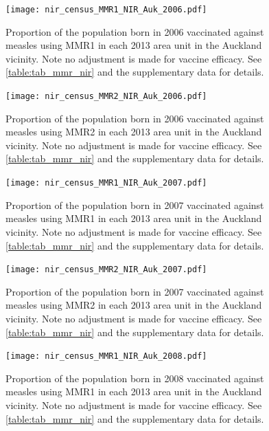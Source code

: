 \documentclass{article}
\begin{document}
% 
\begin{figure}
   \begin{center}
    \texttt{[image: nir\_census\_MMR1\_NIR\_Auk\_2006.pdf]}
    \end{center}
    \caption{Proportion of the population born in 2006 vaccinated against measles using MMR1 in each 2013 area unit in the Auckland vicinity. Note no adjustment is made for vaccine efficacy. See \autoref{table:tab_mmr_nir} and the supplementary data for details.}
\label{fig:fig12006_a}
\end{figure}
% 
\begin{figure}
\begin{center}
\texttt{[image: nir\_census\_MMR2\_NIR\_Auk\_2006.pdf]}
\end{center}
    \caption{Proportion of the population born in 2006 vaccinated against measles using MMR2 in each 2013 area unit in the Auckland vicinity. Note no adjustment is made for vaccine efficacy. See \autoref{table:tab_mmr_nir} and the supplementary data for details.}
\label{fig:fig22006_a}
\end{figure}
% 
% 
\begin{figure}
\begin{center}
\texttt{[image: nir\_census\_MMR1\_NIR\_Auk\_2007.pdf]}
\end{center}
    \caption{Proportion of the population born in 2007 vaccinated against measles using MMR1 in each 2013 area unit in the Auckland vicinity. Note no adjustment is made for vaccine efficacy. See \autoref{table:tab_mmr_nir} and the supplementary data for details.}
\label{fig:fig12007_a}
\end{figure}
% 
% 
\begin{figure}
\begin{center}
    \texttt{[image: nir\_census\_MMR2\_NIR\_Auk\_2007.pdf]}
\end{center}
    \caption{Proportion of the population born in 2007 vaccinated against measles using MMR2 in each 2013 area unit in the Auckland vicinity. Note no adjustment is made for vaccine efficacy. See \autoref{table:tab_mmr_nir} and the supplementary data for details.}
\label{fig:fig22007_a}
\end{figure}

% 
\begin{figure}
\begin{center}
    \texttt{[image: nir\_census\_MMR1\_NIR\_Auk\_2008.pdf]}
\end{center}
    \caption{Proportion of the population born in 2008 vaccinated against measles using MMR1 in each 2013 area unit in the Auckland vicinity. Note no adjustment is made for vaccine efficacy. See \autoref{table:tab_mmr_nir} and the supplementary data for details.}
\label{fig:fig12008_a}
\end{figure}
\end{document}

